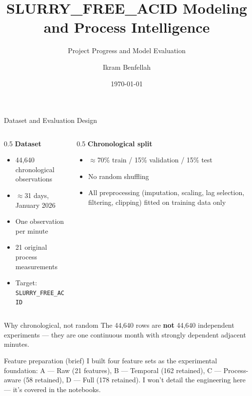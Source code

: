 \documentclass[11pt,aspectratio=169]{beamer}
\title[SLURRY\_FREE\_ACID Progress]{SLURRY\_FREE\_ACID Modeling and Process Intelligence}
\subtitle{Project Progress and Model Evaluation}
\author{Ikram Benfellah}
\institute{OCP Group — Internship Progress Update}
\date{\today}
\begin{document}
\begin{frame}
\titlepage
\end{frame}


\begin{frame}{Dataset and Evaluation Design}
\begin{columns}[T]
\begin{column}{0.5\textwidth}
\textbf{Dataset}
\begin{itemize}
    \small
    \item 44{,}640 chronological observations
    \item $\approx$31 days, January 2026
    \item One observation per minute
    \item 21 original process measurements
    \item Target: \texttt{SLURRY\_FREE\_ACID}
\end{itemize}
\end{column}
\begin{column}{0.5\textwidth}
\textbf{Chronological split}
\begin{itemize}
    \small
    \item $\approx$70\% train / 15\% validation / 15\% test
    \item No random shuffling
    \item All preprocessing (imputation, scaling, lag selection, filtering, clipping) fitted on training data only
\end{itemize}
\end{column}
\end{columns}
\vspace{0.3cm}
\begin{alertblock}{Why chronological, not random}
\small The 44,640 rows are \textbf{not} 44,640 independent experiments — they are one continuous month with strongly dependent adjacent minutes.
\end{alertblock}
\begin{block}{Feature preparation (brief)}
\small I built four feature sets as the experimental foundation: A — Raw (21 features), B — Temporal (162 retained), C — Process-aware (58 retained), D — Full (178 retained). I won't detail the engineering here — it's covered in the notebooks.
\end{block}
\end{frame}
\end{document}
